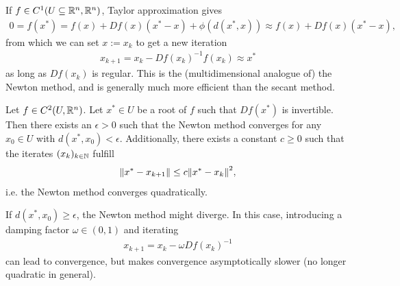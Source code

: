 \noindent
If $f \in C^1(U \subseteq \mathbb{R}^n, \mathbb{R}^n)$, Taylor approximation gives
\begin{align*}
	0 = f(x^*) = f(x) + Df(x)(x^*-x) + \phi(d(x^*, x))
	\approx f(x) + Df(x)(x^*-x),
\end{align*}
from which we can set $x := x_k$ to get a new iteration
\begin{align*}
	x_{k+1} = x_k - Df(x_k)^{-1} f(x_k) \approx x^*
\end{align*}
as long as $Df(x_k)$ is regular. This is the (multidimensional analogue of) the Newton method, and is generally much more efficient than the secant method.
\begin{theorem}
	Let $f \in C^2(U, \mathbb{R}^n)$. Let $x^* \in U$ be a root of $f$ such that $Df(x^*)$ is invertible. Then there exists an $\epsilon > 0$ such that the Newton method converges for any $x_0 \in U$ with $d(x^*, x_0) < \epsilon$. Additionally, there exists a constant $c \geq 0$ such that the iterates $(x_k)_{k \in \mathbb{N}}$ fulfill
	\begin{align*}
		\norm{x^* - x_{k+1}} \leq c \norm{x^* - x_k}^2,
	\end{align*}
	i.e. the Newton method converges quadratically.
\end{theorem}
If $d(x^*, x_0) \geq \epsilon$, the Newton method might diverge. In this case, introducing a damping factor $\omega \in (0,1)$ and iterating
\begin{align*}
	x_{k+1} = x_k - \omega Df(x_k)^{-1}
\end{align*}
can lead to convergence, but makes convergence asymptotically slower (no longer quadratic in general).


